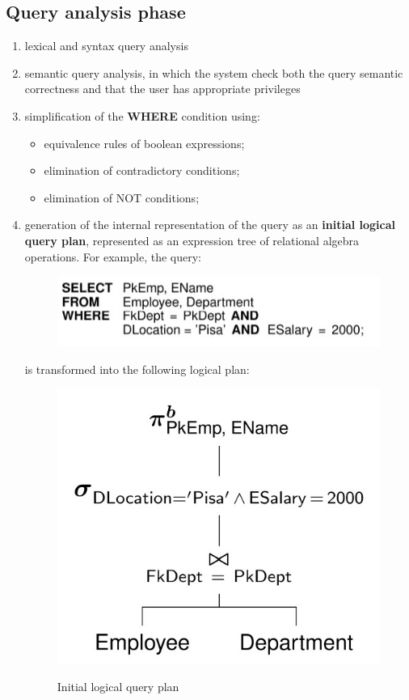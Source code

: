 \subsection{Query analysis phase}
\begin{enumerate}
    \item lexical and syntax query analysis
    \item semantic query analysis, in which the system check both the query semantic correctness and that the user has appropriate privileges
    \item simplification of the \textbf{WHERE} condition using:
    \begin{itemize}
        \item equivalence rules of boolean expressions;
        \item elimination of contradictory conditions;
        \item elimination of NOT conditions;
    \end{itemize}
    \item generation of the internal representation of the query as an \textbf{initial logical query plan}, represented as an expression tree of relational algebra operations. For example, the query: 

    \begin{figure}[h!]
		\centering
		\includegraphics[scale = 1.3]{img/queop2.jpg}
		\label{relop13}
    \end{figure}

    is transformed into the following logical plan:

    \begin{figure}[h!]
		\centering
		\includegraphics[scale = 0.9]{img/queop3.jpg}
		\label{queop3}
        \caption{Initial logical query plan}
    \end{figure}
    
\end{enumerate}

